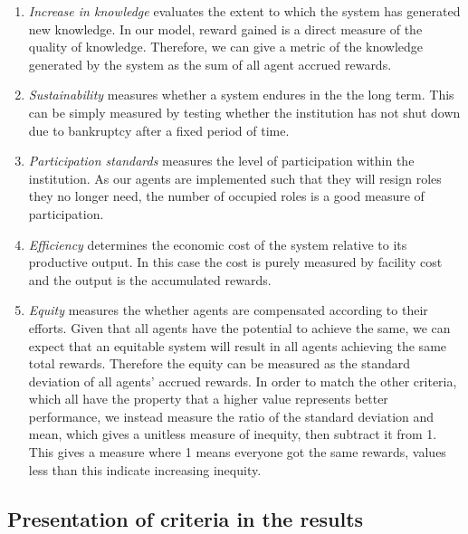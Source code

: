 \begin{enumerate}
\item \emph{Increase in knowledge} evaluates the extent to which the system has
generated new knowledge. In our model, reward gained is a direct measure of the
quality of knowledge. Therefore, we can give a metric of the knowledge generated
by the system as the sum of all agent accrued rewards.


\item \emph{Sustainability} measures whether a system endures in the the long term.
This can be simply measured by testing whether the institution has not shut down 
due to bankruptcy after a fixed period of time.


\item \emph{Participation standards} measures the level of participation within the 
institution. As our agents are implemented such that they will resign roles they 
no longer need, the number of occupied roles is a good measure of participation.

\item \emph{Efficiency} determines the economic cost of the system relative to its productive output. In this case the cost is purely measured by facility cost and the output is the accumulated rewards.

\item \emph{Equity} measures the whether agents are compensated according to
their efforts.  Given that all agents have the potential to achieve the same,
we can expect that an equitable system will result in all agents achieving the
same total rewards. Therefore the equity can be measured as the standard
deviation of all agents' accrued rewards.  In order to match the other
criteria, which all have the property that a higher value represents better
performance, we instead measure the ratio of the standard deviation and mean,
which gives a unitless measure of inequity, then subtract it from 1. This
gives a measure where 1 means everyone got the same rewards, values less than
this indicate increasing inequity.
\end{enumerate}

\subsection*{Presentation of criteria in the results}


